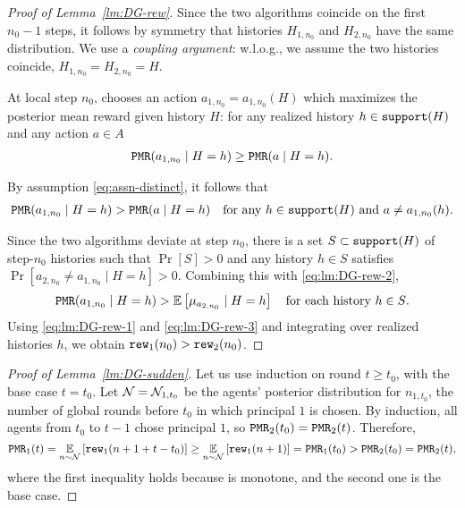 \begin{proof}[Proof of Lemma~\ref{lm:DG-rew}]
Since the two algorithms coincide on the first $n_0-1$ steps, it follows by symmetry that histories $H_{1,n_0}$ and $H_{2,n_0}$ have the same distribution. We use a \emph{coupling argument}: w.l.o.g., we assume the two histories coincide,
    $H_{1,n_0} = H_{2,n_0} = H$.

At local step $n_0$, \DynGreedy chooses an action $a_{1,n_0} = a_{1,n_0}(H)$
which maximizes the posterior mean reward given history $H$: for any realized history $h\in \mathtt{support}(H)$ and any action $a\in A$
\begin{align}\label{eq:lm:DG-rew-1}
 \mathtt{PMR}(a_{1,n_0} \mid H = h) \geq \mathtt{PMR}(a \mid H=h).
\end{align}

By assumption \eqref{eq:assn-distinct}, it follows that
\begin{align}\label{eq:lm:DG-rew-2}
 \mathtt{PMR}(a_{1,n_0} \mid H = h) > \mathtt{PMR}(a \mid H=h)
 \quad \text{for any $h\in \mathtt{support}(H)$ and $a\neq a_{1,n_0}(h)$.}
\end{align}

Since the two algorithms deviate at step $n_0$, there is a set $S\subset \mathtt{support}(H)$ of step-$n_0$ histories such that $\Pr[S]>0$ and any history $h\in S$ satisfies
    $\Pr[a_{2,n_0}\neq a_{1,n_0} \mid H=h]>0$.
Combining this with \eqref{eq:lm:DG-rew-2},
\begin{align}\label{eq:lm:DG-rew-3}
 \PMR(a_{1,n_0} \mid H = h) > \E\left[ \mu_{a_{2,n_0}}\mid H=h \right]
 \quad\text{for each history $h\in S$}.
\end{align}
Using \eqref{eq:lm:DG-rew-1} and \eqref{eq:lm:DG-rew-3} and integrating over realized histories $h$, we obtain
    $\mathtt{rew}_1(n_0) > \mathtt{rew}_2(n_0)$.
\end{proof}

\begin{proof}[Proof of Lemma~\ref{lm:DG-sudden}]
Let us use induction on round $t\geq t_0$, with the base case $t=t_0$. Let $\mathcal{N}=\mathcal{N}_{1,t_0}$ be the agents' posterior distribution for $n_{1,t_0}$, the number of global rounds before $t_0$ in which principal $1$ is chosen. By induction, all agents from $t_0$ to $t-1$ chose principal $1$, so $\mathtt{PMR}_2(t_0)= \mathtt{PMR}_2(t)$. Therefore,
\[ \mathtt{PMR}_1(t)
    = \operatorname*{\mathbb{E}}_{n\sim \mathcal{N}}\left[\mathtt{rew}_1(n+1+t-t_0)\right]
    \geq \operatorname*{\mathbb{E}}_{n\sim \mathcal{N}}\left[\mathtt{rew}_1(n+1)\right]
    =\mathtt{PMR}_1(t_0) > \mathtt{PMR}_2(t_0)= \mathtt{PMR}_2(t), \]
where the first inequality holds because \alg[1] is monotone, and the second one is the base case.
\end{proof}

